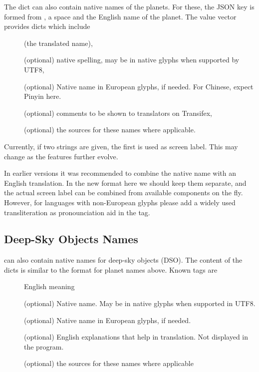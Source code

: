 The   dict can also contain native names of the planets. 
For these, the JSON key is formed from , a space and the English name of the planet. 
The value vector provides dicts which include 
\begin{description}
\item[] (the translated name), 
\item[] (optional) native spelling, may be in native glyphs when supported by UTF8, 
\item[] (optional) Native name in European glyphs, if needed. For Chinese, expect Pinyin here.
\item[] (optional) comments to be shown to translators on Transifex, 
\item[] (optional) the sources for these names where applicable.
\end{description}

Currently, if two  strings are given, the first is used as screen label. This may change as the features further evolve.

In earlier versions it was recommended to combine the native name with an English translation. 
In the new format here we should keep them separate, and the actual screen label can be combined from available components on the fly.
However, for languages with non-European glyphs please add a widely used transliteration as pronounciation aid in the  tag.



\subsection{Deep-Sky Objects Names}
\label{sec:skycultures:dsonames}

 can also contain native names for
deep-sky objects (DSO). The content  of the dicts is similar to the 
format for planet names above. %
Known tags are 
\begin{description}
\item[] English meaning
\item[] (optional) Native name. May be in native glyphs when supported in UTF8.
\item[] (optional) Native name in European glyphs, if needed.
\item[] (optional) English explanations that help in translation. Not displayed in the program.
\item[]  (optional) the sources for these names where applicable
\end{description}




